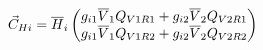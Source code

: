 \documentclass[12pt]{article}
\newcommand\barre[1]{\overline{\rule{0pt}{1.5ex}#1}}
\begin{document}
\begin{equation}
\vec{C}_{Hi}= \barre{H}_i
\begin{pmatrix}
g_{i1}\barre{V}_1Q_{V1R1}+g_{i2}\barre{V}_2Q_{V2R1} \\
g_{i1}\barre{V}_1Q_{V1R2}+g_{i2}\barre{V}_2Q_{V2R2} \\
\end{pmatrix} 
\end{equation}
\end{document}
